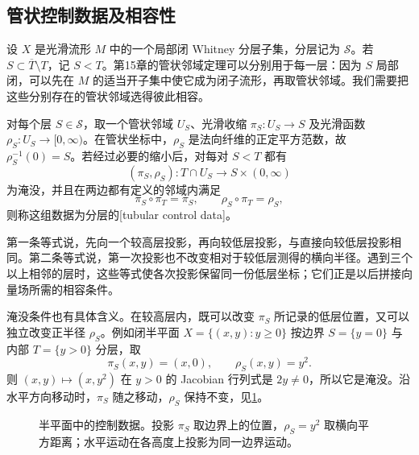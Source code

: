 \subsection{管状控制数据及相容性}
\label{g2:subsec:B02:01}

设 \(X\) 是光滑流形 \(M\) 中的一个局部闭 Whitney 分层子集，分层记为 \(\mathcal S\)。若 \(S\subset\overline T\setminus T\)，记 \(S<T\)。第15章的管状邻域定理可以分别用于每一层：因为 \(S\) 局部闭，可以先在 \(M\) 的适当开子集中使它成为闭子流形，再取管状邻域。我们需要把这些分别存在的管状邻域选得彼此相容。

\begin{definition}\label{g2:def:tubular-control-data}
	对每个层 \(S\in\mathcal S\)，取一个管状邻域 \(U_S\)、光滑收缩 \(\pi_S:U_S\to S\) 及光滑函数 \(\rho_S:U_S\to[0,\infty)\)。在管状坐标中，\(\rho_S\) 是法向纤维的正定平方范数，故 \(\rho_S^{-1}(0)=S\)。若经过必要的缩小后，对每对 \(S<T\) 都有
	\[
		(\pi_S,\rho_S):T\cap U_S\longrightarrow S\times(0,\infty)
	\]
	为淹没，并且在两边都有定义的邻域内满足
	\begin{equation}\label{g2:eq:tube-control-identities}
		\pi_S\circ\pi_T=\pi_S,\qquad
		\rho_S\circ\pi_T=\rho_S,
	\end{equation}
	则称这组数据为分层的[tubular control data]。
\end{definition}

第一条等式说，先向一个较高层投影，再向较低层投影，与直接向较低层投影相同。第二条等式说，第一次投影也不改变相对于较低层测得的横向半径。遇到三个以上相邻的层时，这些等式使各次投影保留同一份低层坐标；它们正是以后拼接向量场所需的相容条件。

\ProseParagraphBreak

淹没条件也有具体含义。在较高层内，既可以改变 \(\pi_S\) 所记录的低层位置，又可以独立改变正半径 \(\rho_S\)。例如闭半平面 \(X=\{(x,y):y\ge0\}\) 按边界 \(S=\{y=0\}\) 与内部 \(T=\{y>0\}\) 分层，取
\[
	\pi_S(x,y)=(x,0),\qquad \rho_S(x,y)=y^2.
\]
则 \((x,y)\mapsto(x,y^2)\) 在 \(y>0\) 的 Jacobian 行列式是 \(2y\ne0\)，所以它是淹没。沿水平方向移动时，\(\pi_S\) 随之移动，\(\rho_S\) 保持不变，见\cref{g2:fig:control-tube}。

\begin{figure}[htbp]
	\centering
	
	\caption{半平面中的控制数据。投影 \(\pi_S\) 取边界上的位置，\(\rho_S=y^2\) 取横向平方距离；水平运动在各高度上投影为同一边界运动。}
	\label{g2:fig:control-tube}
\end{figure}

